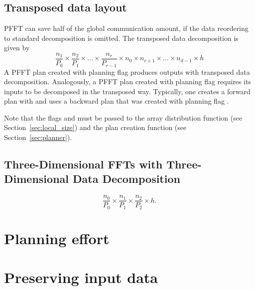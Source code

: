 \subsection{Transposed data layout}
PFFT can save half of the global communication amount, if the data reordering to standard decomposition is omitted. 
The transposed data decomposition is given by
\begin{equation*}
  \frac{n_1}{P_0} \times \frac{n_2}{P_1} \times \hdots \times \frac{n_{r}}{P_{r-1}}  \times n_0 \times n_{r+1} \times \hdots \times n_{d-1} \times h
\end{equation*}
A PFFT plan created with planning flag  produces outputs with transposed data decomposition.
Analogously, a PFFT plan created with planning flag  requires its inputs to be decomposed in the transposed way.
Typically, one creates a forward plan with  and uses a backward plan that was created with planning flag .

Note that the flags  and  must be passed to the array distribution function (see Section~\ref{sec:local_size})
and the plan creation function (see Section~\ref{sec:planner}).

\subsection{Three-Dimensional FFTs with Three-Dimensional Data Decomposition}
\begin{equation*}
  \frac{n_0}{P_0} \times \frac{n_1}{P_1} \times \frac{n_2}{P_2} \times h.
\end{equation*}


\section{Planning effort}
\begin{compactitem}
  \item {}
  \item {}
  \item {}
  \item {}
  \item {}
  \item {}
\end{compactitem}


\section{Preserving input data}
\begin{compactitem}
  \item {}
  \item {}
  \item {}
\end{compactitem}

